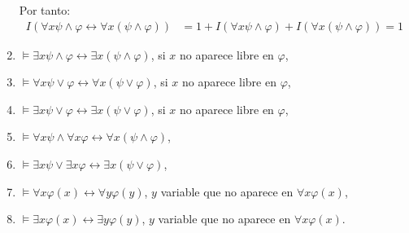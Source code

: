 \begin{ejercicio}
\begin{enumerate}
        Por tanto:
        \begin{align*}
            I( \forall x \psi \wedge \varphi \leftrightarrow \forall x(\psi \wedge \varphi))
            &= 1+I(\forall x \psi \wedge \varphi)+I(\forall x(\psi \wedge \varphi))=1
        \end{align*}
        \item $\models \exists x \psi \wedge \varphi \leftrightarrow \exists x(\psi \wedge \varphi)$, si $x$ no aparece libre en $\varphi$,
        \item $\models \forall x \psi \vee \varphi \leftrightarrow \forall x(\psi \vee \varphi)$, si $x$ no aparece libre en $\varphi$,
        \item $\models \exists x \psi \vee \varphi \leftrightarrow \exists x(\psi \vee \varphi)$, si $x$ no aparece libre en $\varphi$,
        \item $\models \forall x \psi \wedge \forall x \varphi \leftrightarrow \forall x(\psi \wedge \varphi)$,
        \item $\models \exists x \psi \vee \exists x \varphi \leftrightarrow \exists x(\psi \vee \varphi)$,
        \item $\models \forall x \varphi(x) \leftrightarrow \forall y \varphi(y)$, $y$ variable que no aparece en $\forall x \varphi(x)$,
        \item $\models \exists x \varphi(x) \leftrightarrow \exists y \varphi(y)$, $y$ variable que no aparece en $\forall x \varphi(x)$.
    \end{enumerate}
\end{ejercicio}

\begin{comment}
\setcounter{ejercicio}{6}
\begin{ejercicio}\label{ej:2.7}
    Demuestra que $\not\models \forall x(\psi \vee \varphi) \rightarrow (\forall x \psi \vee \forall x \varphi)$.
\end{ejercicio}
\end{comment}

\begin{comment}
\setcounter{ejercicio}{7}
\begin{ejercicio}\label{ej:2.8}
    $\models \forall x(\psi \rightarrow \varphi) \rightarrow (\exists x \psi \rightarrow \exists x \varphi)$.
\end{ejercicio}
\end{comment}

\begin{comment}
\setcounter{ejercicio}{8}
\begin{ejercicio}\label{ej:2.9}
    $\models \exists x(\psi \rightarrow \varphi) \rightarrow (\forall x \psi \rightarrow \varphi)$, supuesto que $x$ no aparece libre en $\varphi$ (pista: intenta probar $\{\neg \varphi, \forall x \psi\} \models \forall x \neg (\psi \rightarrow \varphi)$).
\end{ejercicio}
\end{comment}

